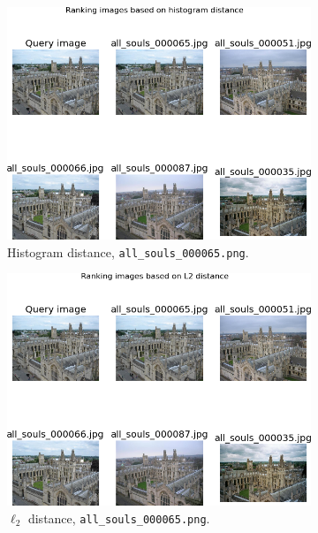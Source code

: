 \documentclass[a4paper,10pt,twoside]{article}
\begin{document}
\begin{figure}
  \begin{subfigure}{0.47\textwidth}
    \centering
    \includegraphics[width=\textwidth]{ranking_h_a}
    \caption{Histogram distance, \texttt{all\_souls\_000065.png}.}
  \end{subfigure}
  \hspace*{\fill}
  \begin{subfigure}{0.47\textwidth}
    \centering
    \includegraphics[width=\textwidth]{ranking_l_a}
    \caption{$\ell_2$ distance, \texttt{all\_souls\_000065.png}.}
  \end{subfigure}
  \begin{subfigure}{0.47\textwidth}

\end{subfigure}
\end{figure}
\end{document}

